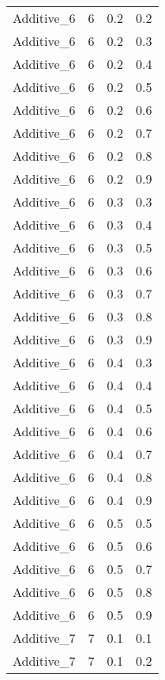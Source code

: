 \documentclass{article}
\begin{document}
\begin{longtable}[H]{lrrr}
 Additive\_6 &       6 &   0.2 &            0.2 \\
 Additive\_6 &       6 &   0.2 &            0.3 \\
 Additive\_6 &       6 &   0.2 &            0.4 \\
 Additive\_6 &       6 &   0.2 &            0.5 \\
 Additive\_6 &       6 &   0.2 &            0.6 \\
 Additive\_6 &       6 &   0.2 &            0.7 \\
 Additive\_6 &       6 &   0.2 &            0.8 \\
 Additive\_6 &       6 &   0.2 &            0.9 \\
 Additive\_6 &       6 &   0.3 &            0.3 \\
 Additive\_6 &       6 &   0.3 &            0.4 \\
 Additive\_6 &       6 &   0.3 &            0.5 \\
 Additive\_6 &       6 &   0.3 &            0.6 \\
 Additive\_6 &       6 &   0.3 &            0.7 \\
 Additive\_6 &       6 &   0.3 &            0.8 \\
 Additive\_6 &       6 &   0.3 &            0.9 \\
 Additive\_6 &       6 &   0.4 &            0.3 \\
 Additive\_6 &       6 &   0.4 &            0.4 \\
 Additive\_6 &       6 &   0.4 &            0.5 \\
 Additive\_6 &       6 &   0.4 &            0.6 \\
 Additive\_6 &       6 &   0.4 &            0.7 \\
 Additive\_6 &       6 &   0.4 &            0.8 \\
 Additive\_6 &       6 &   0.4 &            0.9 \\
 Additive\_6 &       6 &   0.5 &            0.5 \\
 Additive\_6 &       6 &   0.5 &            0.6 \\
 Additive\_6 &       6 &   0.5 &            0.7 \\
 Additive\_6 &       6 &   0.5 &            0.8 \\
 Additive\_6 &       6 &   0.5 &            0.9 \\
 Additive\_7 &       7 &   0.1 &            0.1 \\
 Additive\_7 &       7 &   0.1 &            0.2 \\

\end{longtable}
\end{document}
